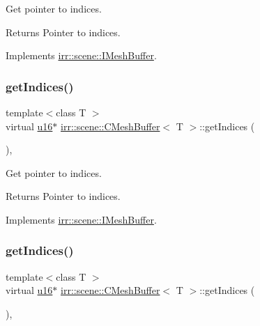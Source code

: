 Get pointer to indices. 

\begin{DoxyReturn}{Returns}
Pointer to indices. 
\end{DoxyReturn}


Implements \hyperlink{classirr_1_1scene_1_1IMeshBuffer_a76c0013378012af7aeb6cb8f4ea8f9a1}{irr\+::scene\+::\+I\+Mesh\+Buffer}.

\mbox{\label{classirr_1_1scene_1_1CMeshBuffer_a34a85f4868776d4cf312cdece5326c89}} 
\subsubsection{\texorpdfstring{get\+Indices()}{getIndices()}\hspace{0.1cm}{\footnotesize\ttfamily [3/4]}}
{\footnotesize\ttfamily template$<$class T $>$ \\
virtual \hyperlink{namespaceirr_ae9f8ec82692ad3b83c21f555bfa70bcc}{u16}$\ast$ \hyperlink{classirr_1_1scene_1_1CMeshBuffer}{irr\+::scene\+::\+C\+Mesh\+Buffer}$<$ T $>$\+::get\+Indices (\begin{DoxyParamCaption}{ }\end{DoxyParamCaption})\hspace{0.3cm}{\ttfamily [inline]}, {\ttfamily [virtual]}}



Get pointer to indices. 

\begin{DoxyReturn}{Returns}
Pointer to indices. 
\end{DoxyReturn}


Implements \hyperlink{classirr_1_1scene_1_1IMeshBuffer_a3d33a561023314677361e30cf07ae429}{irr\+::scene\+::\+I\+Mesh\+Buffer}.

\mbox{\label{classirr_1_1scene_1_1CMeshBuffer_a34a85f4868776d4cf312cdece5326c89}} 
\subsubsection{\texorpdfstring{get\+Indices()}{getIndices()}\hspace{0.1cm}{\footnotesize\ttfamily [4/4]}}
{\footnotesize\ttfamily template$<$class T $>$ \\
virtual \hyperlink{namespaceirr_ae9f8ec82692ad3b83c21f555bfa70bcc}{u16}$\ast$ \hyperlink{classirr_1_1scene_1_1CMeshBuffer}{irr\+::scene\+::\+C\+Mesh\+Buffer}$<$ T $>$\+::get\+Indices (\begin{DoxyParamCaption}{ }\end{DoxyParamCaption})\hspace{0.3cm}{\ttfamily [inline]}, {\ttfamily [virtual]}}



